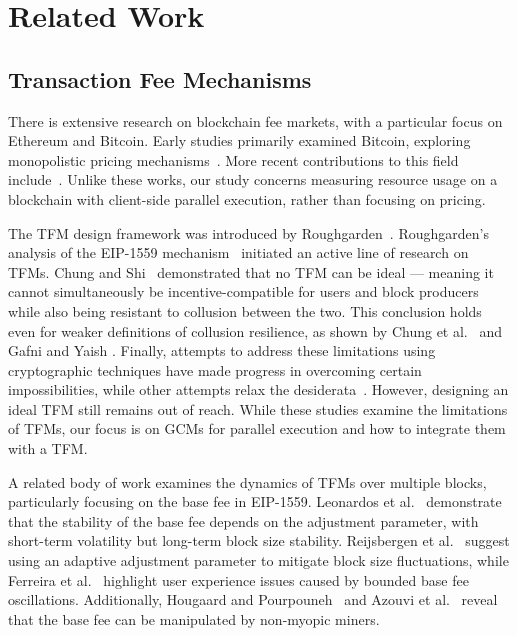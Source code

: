\section{Related Work}
\subsection{Transaction Fee Mechanisms}

There is extensive research on blockchain fee markets, with a particular focus on Ethereum and Bitcoin. Early studies primarily examined Bitcoin, exploring monopolistic pricing mechanisms~\cite{lavi2022redesigning,yao2020incentive}. More recent contributions to this field include~\cite{nisan2023serial,gafni2022greedy,penna2024serial}. Unlike these works, our study concerns measuring resource usage on a blockchain with client-side parallel execution, rather than focusing on pricing.



The TFM design framework was introduced by Roughgarden~\cite{roughgarden2020transaction,roughgarden2024transaction}. Roughgarden's analysis of the EIP-1559 mechanism~\cite{eip1559spec} initiated an active line of research on TFMs. Chung and Shi~\cite{chung2023foundations} demonstrated that no TFM can be ideal --- meaning it cannot simultaneously be incentive-compatible for users and block producers while also being resistant to collusion between the two. This conclusion holds even for weaker definitions of collusion resilience, as shown by Chung et al.~\cite{chung2024collusion} and Gafni and Yaish \cite{gafni2024barriers}. Finally, attempts to address these limitations using cryptographic techniques \cite{shi2022can,wu2023maximizing} have made progress in overcoming certain impossibilities, while other attempts relax the desiderata~\cite{gafni2024discrete}. However, designing an ideal TFM still remains out of reach. While these studies examine the limitations of TFMs, our focus is on GCMs for parallel execution and how to integrate them with a TFM.

A related body of work examines the dynamics of TFMs over multiple blocks, particularly focusing on the base fee in EIP-1559. Leonardos et al.~\cite{leonardos2021dynamical,leonardos2023optimality} demonstrate that the stability of the base fee depends on the adjustment parameter, with short-term volatility but long-term block size stability. Reijsbergen et al.~\cite{reijsbergen2021transaction} suggest using an adaptive adjustment parameter to mitigate block size fluctuations, while Ferreira et al.~\cite{ferreira2021dynamic} highlight user experience issues caused by bounded base fee oscillations. Additionally, Hougaard and Pourpouneh~\cite{hougaard2023farsighted} and Azouvi et al.~\cite{azouvi2023base} reveal that the base fee can be manipulated by non-myopic miners.

